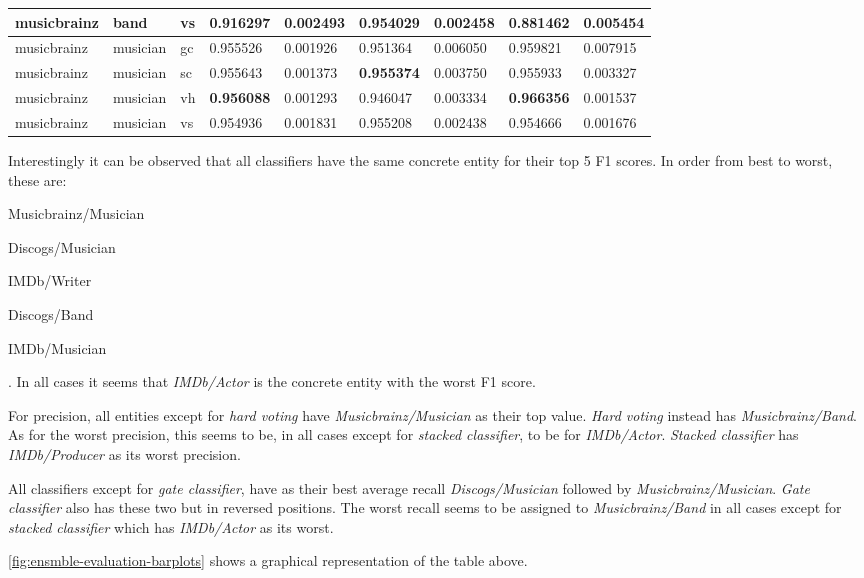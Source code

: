 \documentclass[epsfig,a4paper,11pt,titlepage,twoside,openany]{book}
\begin{document}
\begin{longtable}{|l|l|l|l|l|l|l|l|l|}
musicbrainz & band     & vs    & 0.916297          & 0.002493 & \textbf{0.954029} & 0.002458 & 0.881462          & 0.005454 \\ \hline
musicbrainz & musician & gc    & 0.955526          & 0.001926 & 0.951364          & 0.006050 & 0.959821          & 0.007915 \\
musicbrainz & musician & sc    & 0.955643          & 0.001373 & \textbf{0.955374} & 0.003750 & 0.955933          & 0.003327 \\
musicbrainz & musician & vh    & \textbf{0.956088} & 0.001293 & 0.946047          & 0.003334 & \textbf{0.966356} & 0.001537 \\
musicbrainz & musician & vs    & 0.954936          & 0.001831 & 0.955208          & 0.002438 & 0.954666          & 0.001676 \\ \hline
\end{longtable}


Interestingly it can be observed that all classifiers have the same concrete entity for their top 5 F1 scores. In order from best to worst, these are: 
\begin{itemize*}
    \item Musicbrainz/Musician
    \item Discogs/Musician
    \item IMDb/Writer
    \item Discogs/Band
    \item IMDb/Musician
\end{itemize*}. In all cases it seems that \textit{IMDb/Actor} is the concrete entity with the worst F1 score.

For precision, all entities except for \textit{hard voting} have \textit{Musicbrainz/Musician} as their top value. \textit{Hard voting} instead has \textit{Musicbrainz/Band}. As for the worst precision, this seems to be, in all cases except for \textit{stacked classifier}, to be for \textit{IMDb/Actor}. \textit{Stacked classifier} has \textit{IMDb/Producer} as its worst precision.

All classifiers except for \textit{gate classifier}, have as their best average recall \textit{Discogs/Musician} followed by \textit{Musicbrainz/Musician}. \textit{Gate classifier} also has these two but in reversed positions. The worst recall seems to be assigned to \textit{Musicbrainz/Band} in all cases except for \textit{stacked classifier} which has \textit{IMDb/Actor} as its worst. 

\autoref{fig:ensmble-evaluation-barplots} shows a graphical representation of the table above.
\end{document}
